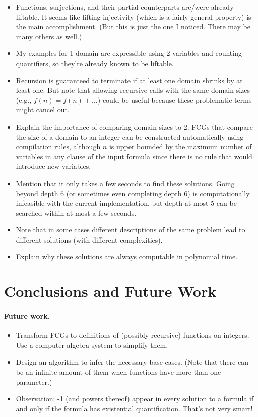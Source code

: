 \begin{itemize}
  \item Functions, surjections, and their partial counterparts are/were already
        liftable. It seems like lifting injectivity (which is a fairly general
        property) is the main accomplishment. (But this is just the one I
        noticed. There may be many others as well.)
  \item My examples for 1 domain are expressible using 2 variables and counting
        quantifiers, so they're already known to be liftable.
  \item Recursion is guaranteed to terminate if at least one domain shrinks by
        at least one. But note that allowing recursive calls with the same
        domain sizes (e.g., $f(n) = f(n) + \dots$) could be useful because these
        problematic terms might cancel out.
  \item Explain the importance of comparing domain sizes to 2. FCGs that compare
        the size of a domain to an integer can be constructed automatically
        using compilation rules, although $n$ is upper bounded by the maximum
        number of variables in any clause of the input formula since there is no
        rule that would introduce new variables.
  \item Mention that it only takes a few seconds to find these solutions. Going
        beyond depth 6 (or sometimes even completing depth 6) is computationally
        infeasible with the current implementation, but depth at most 5 can be
        searched within at most a few seconds.
  \item Note that in some cases different descriptions of the same problem lead
        to different solutions (with different complexities).
  \item Explain why these solutions are always computable in polynomial time.
\end{itemize}

\section{Conclusions and Future Work}

\paragraph{Future work.}
\begin{itemize}
  \item Transform FCGs to definitions of (possibly recursive) functions on
        integers. Use a computer algebra system to simplify them.
  \item Design an algorithm to infer the necessary base cases. (Note that there
        can be an infinite amount of them when functions have more than one
        parameter.)
  \item Observation: -1 (and powers thereof) appear in every solution to a
        formula if and only if the formula has existential quantification.
        That's not very smart!
\end{itemize}


